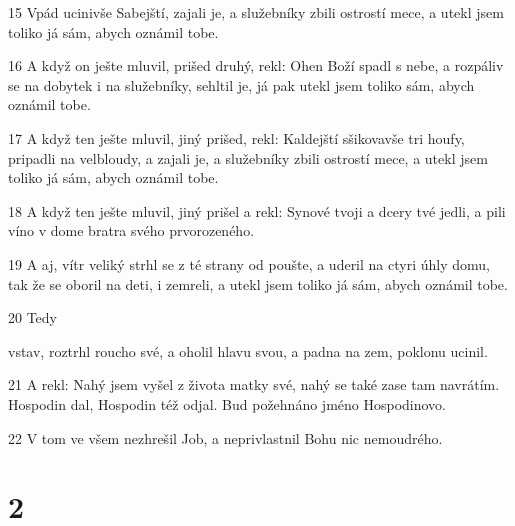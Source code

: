 \par 15 Vpád ucinivše Sabejští, zajali je, a služebníky zbili ostrostí mece, a utekl jsem toliko já sám, abych oznámil tobe.
\par 16 A když on ješte mluvil, prišed druhý, rekl: Ohen Boží spadl s nebe, a rozpáliv se na dobytek i na služebníky, sehltil je, já pak utekl jsem toliko sám, abych oznámil tobe.
\par 17 A když ten ješte mluvil, jiný prišed, rekl: Kaldejští sšikovavše tri houfy, pripadli na velbloudy, a zajali je, a služebníky zbili ostrostí mece, a utekl jsem toliko já sám, abych oznámil tobe.
\par 18 A když ten ješte mluvil, jiný prišel a rekl: Synové tvoji a dcery tvé jedli, a pili víno v dome bratra svého prvorozeného.
\par 19 A aj, vítr veliký strhl se z té strany od poušte, a uderil na ctyri úhly domu, tak že se oboril na deti, i zemreli, a utekl jsem toliko já sám, abych oznámil tobe.
\par 20 Tedy \par vstav, roztrhl roucho své, a oholil hlavu svou, a padna na zem, poklonu ucinil.
\par 21 A rekl: Nahý jsem vyšel z života matky své, nahý se také zase tam navrátím. Hospodin dal, Hospodin též odjal. Bud požehnáno jméno Hospodinovo.
\par 22 V tom ve všem nezhrešil Job, a neprivlastnil Bohu nic nemoudrého.

\chapter{2}

